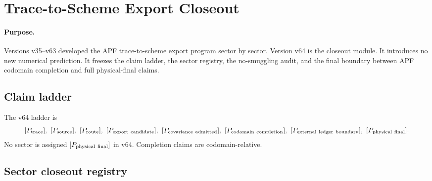 
\section{Trace-to-Scheme Export Closeout}
\label{sec:trace-to-scheme-export-closeout-v64}

\paragraph{Purpose.}
Versions v35--v63 developed the APF trace-to-scheme export program sector by sector.  Version v64 is the closeout module.  It introduces no new numerical prediction.  It freezes the claim ladder, the sector registry, the no-smuggling audit, and the final boundary between APF codomain completion and full physical-final claims.

\begin{center}
\end{center}

\subsection{Claim ladder}

The v64 ladder is
\[
[P_{\rm trace}],\ [P_{\rm source}],\ [P_{\rm route}],\ [P_{\rm export\ candidate}],\
[P_{\rm covariance\ admitted}],\ [P_{\rm codomain\ completion}],\ [P_{\rm external\ ledger\ boundary}],\ [P_{\rm physical\ final}].
\]
No sector is assigned \([P_{\rm physical\ final}]\) in v64.  Completion claims are codomain-relative.

\subsection{Sector closeout registry}

